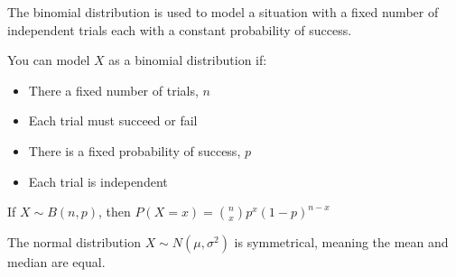 \documentclass[../main.tex]{subfile}
\begin{document}


The binomial distribution is used to model a situation with a fixed number of independent trials each with a constant probability of success.

You can model $X$ as a binomial distribution if:
\begin{itemize}
	\item There a fixed number of trials, $n$
	\item Each trial must succeed or fail
	\item There is a fixed probability of success, $p$
	\item Each trial is independent
\end{itemize}

\begin{center}
If $X \sim B(n, p)$, then $\boxed{P(X = x) = \binom{n}{x} p^x (1 - p)^{n - x}}$
\end{center}


The normal distribution $X \sim N(\mu, \sigma^2)$ is symmetrical, meaning the mean and median are equal.

\begin{figure}[h]
\begin{center}
\end{center}
\end{figure}
\end{document}
